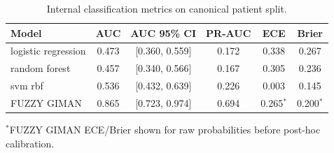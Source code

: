 \begin{table}[t]
\centering
\caption{Internal classification metrics on canonical patient split.}
\label{tab:internal_metrics}
\begin{tabular}{lccccc}
\toprule
Model & AUC & AUC 95\% CI & PR-AUC & ECE & Brier \\
\midrule
logistic regression & 0.473 & [0.360, 0.559] & 0.172 & 0.338 & 0.267 \\
random forest & 0.457 & [0.340, 0.566] & 0.167 & 0.305 & 0.236 \\
svm rbf & 0.536 & [0.432, 0.639] & 0.226 & 0.003 & 0.145 \\
FUZZY GIMAN & 0.865 & [0.723, 0.974] & 0.694 & 0.265$^*$ & 0.200$^*$ \\
\bottomrule
\end{tabular}
\vspace{2pt}
\footnotesize{$^*$FUZZY GIMAN ECE/Brier shown for raw probabilities before post-hoc calibration.}
\end{table}
